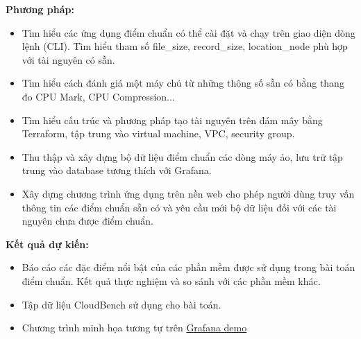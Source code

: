 \documentclass{IEEEtran}
\begin{document}
\textbf{Phương pháp:}
\begin{itemize}
  \item Tìm hiểu các ứng dụng điểm chuẩn\cite{Passmark2023Performancetest, Axboe2023fio, Iozone2016Benchmark, OOKLA2023Speedtest} có thể cài đặt và chạy trên giao diện dòng lệnh (CLI). Tìm hiểu tham số file\_size, record\_size, location\_node phù hợp với tài nguyên có sẵn.
  \item Tìm hiểu cách đánh giá một máy chủ từ những thông số sẵn có bằng thang đo CPU Mark, CPU Compression...
  \item Tìm hiểu cấu trúc và phương pháp tạo tài nguyên trên đám mây bằng Terraform, tập trung vào virtual machine, VPC, security group.
  \item Thu thập và xây dựng bộ dữ liệu điểm chuẩn các dòng máy ảo, lưu trữ tập trung vào database tương thích với Grafana.
  \item Xây dựng chương trình ứng dụng trên nền web cho phép người dùng truy vấn thông tin các điểm chuẩn sẵn có và yêu cầu mới bộ dữ liệu đối với các tài nguyên chưa được điểm chuẩn.
\end{itemize}

\textbf{Kết quả dự kiến:}
\begin{itemize}
  \item Báo cáo các đặc điểm nổi bật của các phần mềm được sử dụng trong bài toán điểm chuẩn. Kết quả thực nghiệm và so sánh với các phần mềm khác.
  \item Tập dữ liệu CloudBench sử dụng cho bài toán.
  \item Chương trình minh họa tương tự trên \href{https://play.grafana.org/d/000000016/1-time-series-graphs?orgId=1}{Grafana demo}
\end{itemize}
\printbibliography[heading=bibintoc, title = {Tài liệu tham khảo}]
\end{document}
